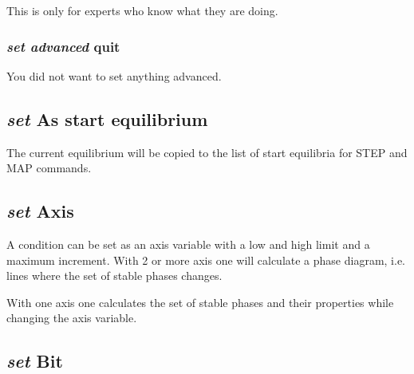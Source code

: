 \documentclass[12pt]{article}
\begin{document}
This is only for experts who know what they are doing.

\subsubsection{{\em set advanced} quit}

You did not want to set anything advanced.

\subsection{{\em set} As start equilibrium}

The current equilibrium will be copied to the list of start equilibria
for STEP and MAP commands.

\subsection{{\em set} Axis}

A condition can be set as an axis variable with a low and high limit
and a maximum increment.  With 2 or more axis one will calculate a
phase diagram, i.e. lines where the set of stable phases changes.

With one axis one calculates the set of stable phases and their
properties while changing the axis variable.

\subsection{{\em set} Bit}
\end{document}
